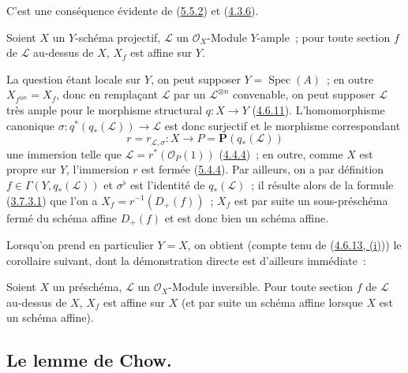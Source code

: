 C'est une conséquence évidente de (\hyperref[II.5.5.2-fr]{5.5.2}) et
(\hyperref[II.4.3.6-fr]{4.3.6}).

\begin{proposition}[5.5.7]
\label{II.5.5.7-fr}
Soient $X$ un $Y$-schéma projectif, $\mathcal{L}$ un $\mathcal{O}_X$-Module
$Y$-ample~; pour toute section $f$ de $\mathcal{L}$ au-dessus de $X$, $X_f$
est affine sur $Y$.
\end{proposition}


La question étant locale sur $Y$, on peut supposer
$Y=\operatorname{Spec}(A)$~; en outre
$X_{f^{\otimes n}}=X_f$, donc en remplaçant $\mathcal{L}$ par un
$\mathcal{L}^{\otimes n}$ convenable, on peut supposer $\mathcal{L}$ très
ample pour le morphisme structural $q:X\to Y$
(\hyperref[II.4.6.11-fr]{4.6.11}). L'homomorphisme canonique
$\sigma:q^*(q_*(\mathcal{L}))\to\mathcal{L}$ est donc surjectif et le
morphisme correspondant
\[
r=r_{\mathcal{L},\sigma}:X\to P=\mathbf{P}(q_*(\mathcal{L}))
\]
une immersion telle que $\mathcal{L}=r^*(\mathcal{O}_P(1))$
(\hyperref[II.4.4.4-fr]{4.4.4})~; en outre, comme $X$ est propre sur $Y$,
l'immersion $r$ est fermée (\hyperref[II.5.4.4-fr]{5.4.4}). Par ailleurs, on
a par définition $f\in\Gamma(Y,q_*(\mathcal{L}))$ et $\sigma^\flat$ est
l'identité de $q_*(\mathcal{L})$~; il résulte alors de la formule
(\hyperref[II.3.7.3.1-fr]{3.7.3.1}) que l'on a $X_f=r^{-1}(D_+(f))$~; $X_f$
est par suite un sous-préschéma fermé du schéma affine $D_+(f)$ et est donc
bien un schéma affine.

Lorsqu'on prend en particulier $Y=X$, on obtient (compte tenu de
(\hyperref[II.4.6.13-fr]{4.6.13, (i)})) le corollaire suivant, dont la
démonstration directe est d'ailleurs immédiate~:

\begin{corollary}[5.5.8]
\label{II.5.5.8-fr}
Soient $X$ un préschéma, $\mathcal{L}$ un $\mathcal{O}_X$-Module inversible.
Pour toute section $f$ de $\mathcal{L}$ au-dessus de $X$, $X_f$ est affine
sur $X$ (et par suite un schéma affine lorsque $X$ est un schéma affine).
\end{corollary}

\subsection{Le lemme de Chow.}
\label{subsection:II.5.6-fr}

